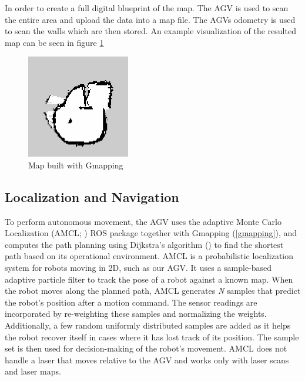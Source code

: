In order to create a full digital blueprint of the map. The AGV is used to scan the entire area and upload the data into a map file. The AGVs odometry is used to scan the walls which are then stored. An example visualization of the resulted map can be seen in figure \ref{fig:app:map}

\begin{figure}[H]
    \centering
    \includegraphics[width=0.4\textwidth,height=0.45\textheight,keepaspectratio]{images/Map.png}
    \caption{Map built with Gmapping}
    \label{fig:app:map}
\end{figure}

\subsection{Localization and Navigation}
To perform autonomous movement, the AGV uses the adaptive Monte Carlo Localization (AMCL; \cite{amcl}) ROS package together with Gmapping (\ref{gmapping}), and computes the path planning using Dijkstra's algorithm (\cite{dijkstra}) to find the shortest path based on its operational environment. AMCL is a probabilistic localization system for robots moving in 2D, such as our AGV. It uses a sample-based adaptive particle filter to track the pose of a robot against a known map. When the robot moves along the planned path, AMCL generates \textit{N} samples that predict the robot’s position after a motion command. The sensor readings are incorporated by re-weighting these samples and normalizing the weights. Additionally, a few random uniformly distributed samples are added as it helps the robot recover itself in cases where it has lost track of its position. The sample set is then used for decision-making of the robot's movement. AMCL does not handle a laser that moves relative to the AGV and works only with laser scans and laser maps. 

